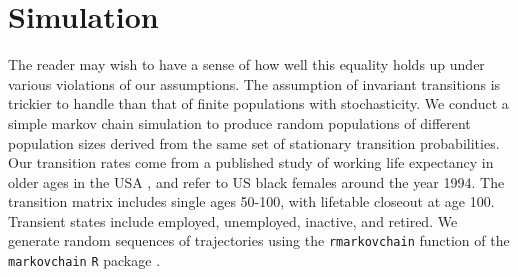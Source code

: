 \documentclass[12pt,oneside,a4paper]{article} %
\theoremstyle{definition}
\begin{document}
\section{Simulation}
The reader may wish to have a sense of how well this equality holds up under
various violations of our assumptions. The assumption of invariant transitions
is trickier to handle than that of finite populations with stochasticity. We
conduct a simple markov chain simulation to
produce random populations of different population sizes derived from the same
set of stationary transition probabilities. Our transition rates come
from a published study of working life expectancy in older ages in the USA
\citep{Dudel2017}, and refer to US black females around the year 1994. The transition matrix includes
single ages 50-100, with lifetable closeout at age 100. Transient states include
employed, unemployed, inactive, and retired. We generate random sequences of
trajectories using the \texttt{rmarkovchain} function of the
\texttt{markovchain} \texttt{R} package \citep{spedicato2017}.


  
\end{document}

